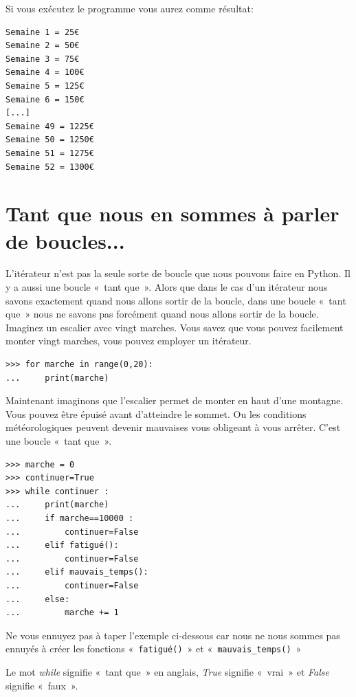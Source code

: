 Si vous exécutez le programme vous aurez comme résultat:

\begin{Verbatim}[frame=single,rulecolor=\color{gray}, label=ne pas saisir]
Semaine 1 = 25€
Semaine 2 = 50€
Semaine 3 = 75€
Semaine 4 = 100€
Semaine 5 = 125€
Semaine 6 = 150€
[...]
Semaine 49 = 1225€
Semaine 50 = 1250€
Semaine 51 = 1275€
Semaine 52 = 1300€
\end{Verbatim}

\section{Tant que nous en sommes à parler de boucles...}

L'itérateur n'est pas la seule sorte de boucle que nous pouvons faire en Python.  Il y a aussi une boucle « tant que ». Alors que dans le cas d'un itérateur nous savons exactement quand nous allons sortir de la boucle, dans une boucle « tant que » nous ne savons pas forcément quand nous allons sortir de la boucle.  Imaginez un escalier avec vingt marches. Vous savez que vous pouvez facilement monter vingt marches, vous pouvez employer un itérateur.

\begin{Verbatim}[frame=single,rulecolor=\color{gray}, label=ne pas saisir]
>>> for marche in range(0,20):
...     print(marche)
\end{Verbatim}

Maintenant imaginons que l'escalier permet de monter en haut d'une montagne. Vous pouvez être épuisé avant d'atteindre le sommet. Ou les conditions météorologiques peuvent devenir mauvaises vous obligeant à vous arrêter.
C'est une boucle « tant que ».

\begin{Verbatim}[frame=single,rulecolor=\color{gray}, label=ne pas saisir]
>>> marche = 0
>>> continuer=True
>>> while continuer :
...     print(marche)
...     if marche==10000 :
...         continuer=False
...     elif fatigué():
...         continuer=False
...     elif mauvais_temps():
...         continuer=False
...     else:
...         marche += 1
\end{Verbatim}

Ne vous ennuyez pas à taper l'exemple ci-dessous car nous ne nous sommes pas ennuyés à créer les fonctions « \texttt{fatigué()} » et « \texttt{mauvais\_temps()} » 

Le mot \emph{while} signifie « tant que » en anglais, \emph{True} signifie « vrai » et \emph{False} signifie « faux ».

